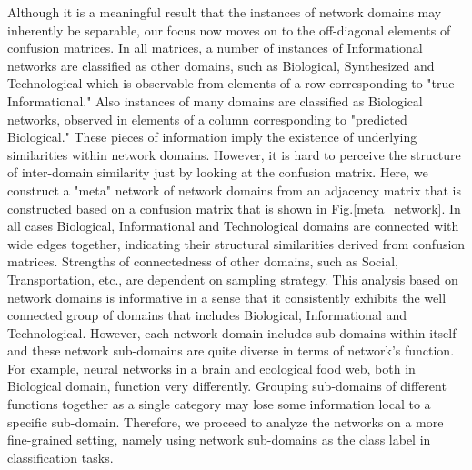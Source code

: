 \documentclass{article}
\begin{document}
Although it is a meaningful result that the instances of network domains may inherently be separable, our focus now moves on to the off-diagonal elements of confusion matrices. In all matrices, a number of instances of Informational networks are classified as other domains, such as Biological, Synthesized and Technological which is observable from elements of a row corresponding to  "true Informational." Also instances of many domains are classified as Biological networks, observed in elements of a column corresponding to "predicted Biological." These pieces of information imply the existence of underlying similarities within network domains. However, it is hard to perceive the structure of inter-domain similarity just by looking at the confusion matrix. Here, we construct a "meta" network of network domains from an adjacency matrix that is constructed based on a confusion matrix that is shown in Fig.\ref{meta_network}. In all cases Biological, Informational and Technological domains are connected with wide edges together, indicating their structural similarities derived from confusion matrices. Strengths of connectedness of other domains, such as Social, Transportation, etc., are dependent on sampling strategy. This analysis based on network domains is informative in a sense that it consistently exhibits the well connected group of domains that includes Biological, Informational and Technological. However, each network domain includes sub-domains within itself and these network sub-domains are quite diverse in terms of network's function. For example, neural networks in a brain and ecological food web, both in Biological domain, function very differently. Grouping sub-domains of different functions together as a single category may lose some information local to a specific sub-domain. Therefore, we proceed to analyze the networks on a more fine-grained setting, namely using network sub-domains as the class label in classification tasks.
 
\end{document}
